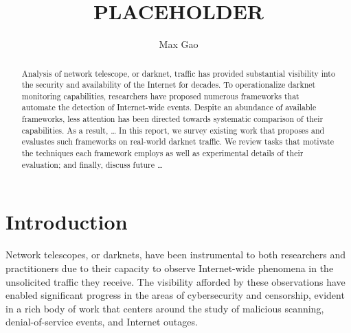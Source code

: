 \documentclass[manuscript,nonacm]{acmart}
\begin{document}
\title{PLACEHOLDER}
\author{Max Gao}

\begin{abstract}
Analysis of network telescope, or darknet, traffic has provided substantial visibility into the security and availability of the Internet for decades.
To operationalize darknet monitoring capabilities, researchers have proposed numerous frameworks that automate the detection of Internet-wide events.
Despite an abundance of available frameworks, less attention has been directed towards systematic comparison of their capabilities. 
As a result, \dots
In this report, we survey existing work that proposes and evaluates such frameworks on real-world darknet traffic.
We review tasks that motivate the techniques each framework employs as well as experimental details of their evaluation; and finally, discuss future \dots
\end{abstract}

\maketitle

\section{Introduction}

Network telescopes, or darknets, have been instrumental to both researchers and practitioners due to their capacity to observe Internet-wide phenomena in the unsolicited traffic they receive. 
The visibility afforded by these observations have enabled significant progress in the areas of cybersecurity and censorship, evident in a rich body of work that centers around the study of malicious scanning, denial-of-service events, and Internet outages. 
\end{document}
